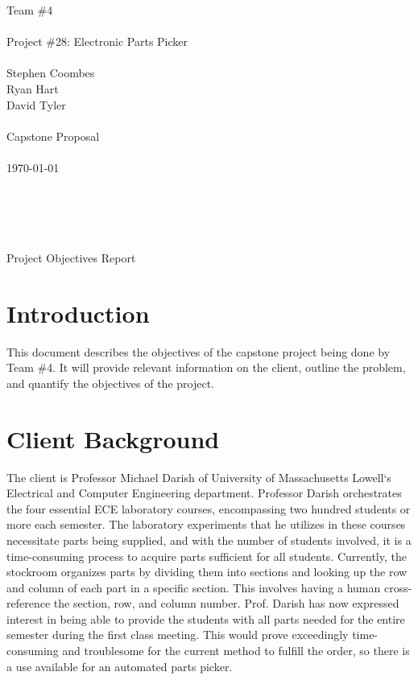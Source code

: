 \documentclass[12pt]{report}
\begin{document}
\noindent Team \#4 \\  \\
Project \#28: Electronic Parts Picker \\ \\
Stephen Coombes \\
Ryan Hart \\
David Tyler \\ \\
Capstone Proposal \\ \\
\today \\ \\ \\ \\ \\
\centerline{Project Objectives Report}
\newpage

\section*{Introduction}

This document describes the objectives of the capstone project being done by Team \#4. It will provide relevant information on the client, outline the problem, and quantify the objectives of the project.


\section*{Client Background}

The client is Professor Michael Darish of University of Massachusetts Lowell`s Electrical and Computer Engineering department.  Professor Darish orchestrates the four essential ECE laboratory courses, encompassing two hundred students or more each semester.  The laboratory experiments that he utilizes in these courses necessitate parts being supplied, and with the number of students involved, it is a time-consuming process to acquire parts sufficient for all students.  Currently, the stockroom organizes parts by dividing them into sections and looking up the row and column of each part in a specific section. This involves having a human cross-reference the section, row, and column number. Prof. Darish has now expressed interest in being able to provide the students with all parts needed for the entire semester during the first class meeting.  This would prove exceedingly time-consuming and troublesome for the current method to fulfill the order, so there is a use available for an automated parts picker.  
\end{document}
